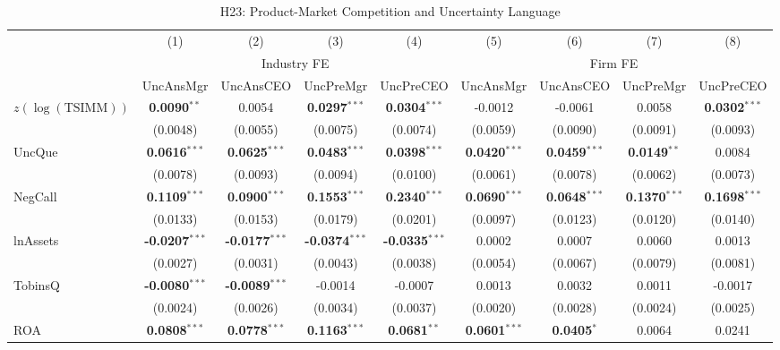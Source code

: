 \documentclass[11pt,a4paper]{article}
\begin{document}
\begin{table}[htbp]
\centering
\caption{H23: Product-Market Competition and Uncertainty Language}
\label{tab:h23_competition_uncertainty}
\scriptsize
\begin{tabular}{lcccccccc}
\toprule
 & (1) & (2) & (3) & (4) & (5) & (6) & (7) & (8) \\
 & \multicolumn{4}{c}{Industry FE} & \multicolumn{4}{c}{Firm FE} \\
\cmidrule(lr){2-5} \cmidrule(lr){6-9}
 & UncAnsMgr & UncAnsCEO & UncPreMgr & UncPreCEO & UncAnsMgr & UncAnsCEO & UncPreMgr & UncPreCEO \\
\midrule
$z(\log(\mathrm{TSIMM}))$ & \textbf{0.0090}$^{**}$ & 0.0054 & \textbf{0.0297}$^{***}$ & \textbf{0.0304}$^{***}$ & -0.0012 & -0.0061 & 0.0058 & \textbf{0.0302}$^{***}$ \\
 & (0.0048) & (0.0055) & (0.0075) & (0.0074) & (0.0059) & (0.0090) & (0.0091) & (0.0093) \\
\midrule
UncQue & \textbf{0.0616}$^{***}$ & \textbf{0.0625}$^{***}$ & \textbf{0.0483}$^{***}$ & \textbf{0.0398}$^{***}$ & \textbf{0.0420}$^{***}$ & \textbf{0.0459}$^{***}$ & \textbf{0.0149}$^{**}$ & 0.0084 \\
 & (0.0078) & (0.0093) & (0.0094) & (0.0100) & (0.0061) & (0.0078) & (0.0062) & (0.0073) \\
NegCall & \textbf{0.1109}$^{***}$ & \textbf{0.0900}$^{***}$ & \textbf{0.1553}$^{***}$ & \textbf{0.2340}$^{***}$ & \textbf{0.0690}$^{***}$ & \textbf{0.0648}$^{***}$ & \textbf{0.1370}$^{***}$ & \textbf{0.1698}$^{***}$ \\
 & (0.0133) & (0.0153) & (0.0179) & (0.0201) & (0.0097) & (0.0123) & (0.0120) & (0.0140) \\
lnAssets & \textbf{-0.0207}$^{***}$ & \textbf{-0.0177}$^{***}$ & \textbf{-0.0374}$^{***}$ & \textbf{-0.0335}$^{***}$ & 0.0002 & 0.0007 & 0.0060 & 0.0013 \\
 & (0.0027) & (0.0031) & (0.0043) & (0.0038) & (0.0054) & (0.0067) & (0.0079) & (0.0081) \\
TobinsQ & \textbf{-0.0080}$^{***}$ & \textbf{-0.0089}$^{***}$ & -0.0014 & -0.0007 & 0.0013 & 0.0032 & 0.0011 & -0.0017 \\
 & (0.0024) & (0.0026) & (0.0034) & (0.0037) & (0.0020) & (0.0028) & (0.0024) & (0.0025) \\
ROA & \textbf{0.0808}$^{***}$ & \textbf{0.0778}$^{***}$ & \textbf{0.1163}$^{***}$ & \textbf{0.0681}$^{**}$ & \textbf{0.0601}$^{***}$ & \textbf{0.0405}$^{*}$ & 0.0064 & 0.0241 \\

\end{tabular}
\end{table}
\end{document}
